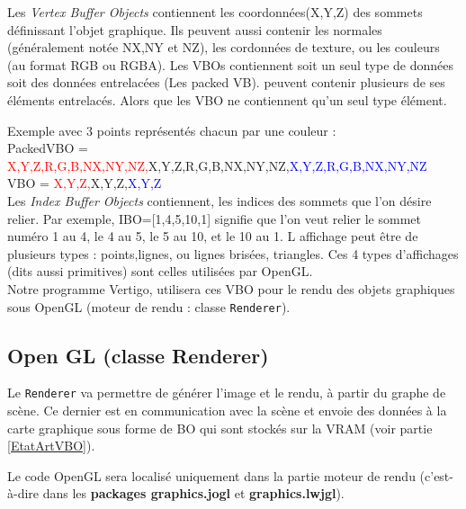 \documentclass[11pt]{report}
\begin{document}
Les \textit{Vertex Buffer Objects}  contiennent les coordonnées(X,Y,Z) des sommets définissant l'objet graphique. Ils peuvent aussi contenir  les normales (généralement notée NX,NY et NZ),  les cordonnées de texture, ou les couleurs (au format RGB ou RGBA).
Les VBOs contiennent soit un seul type de données soit des données entrelacées (Les packed VB).
 peuvent contenir plusieurs de ses éléments entrelacés. Alors que les VBO ne contiennent qu'un seul type élément.
 
 Exemple avec 3 points représentés chacun par une couleur : \\
 
 PackedVBO = \textcolor{red}{X,Y,Z,R,G,B,NX,NY,NZ,}\textcolor{dgreen}{X,Y,Z,R,G,B,NX,NY,NZ,}\textcolor{blue}{X,Y,Z,R,G,B,NX,NY,NZ}\\
 
 VBO = \textcolor{red}{X,Y,Z,}\textcolor{dgreen}{X,Y,Z,}\textcolor{blue}{X,Y,Z} \\

Les \textit{Index Buffer Objects} contiennent, les indices des sommets que l'on désire relier. Par exemple, IBO=[1,4,5,10,1] signifie que l'on veut relier le sommet numéro 1 au 4, le 4 au 5, le 5 au 10, et le 10 au 1. 
 L affichage peut être de plusieurs types : points,lignes, ou lignes  brisées, triangles. Ces 4 types d'affichages (dits aussi primitives) sont celles utilisées par OpenGL.\\
 
 
 
 Notre programme Vertigo, utilisera ces VBO pour le rendu des objets graphiques sous OpenGL (moteur de rendu : classe \texttt{Renderer}).
 
 


\subsection{Open GL (classe Renderer)}

Le \texttt{Renderer} va permettre de générer l'image et le rendu, à partir du graphe de scène. Ce dernier est en communication avec la scène et envoie des données à la carte graphique sous forme de BO qui sont stockés sur la VRAM (voir partie \ref{EtatArtVBO}). 

Le code OpenGL sera localisé uniquement dans la partie moteur de rendu (c'est-à-dire dans les \textbf{packages graphics.jogl} et \textbf{graphics.lwjgl}). \\
\end{document}
